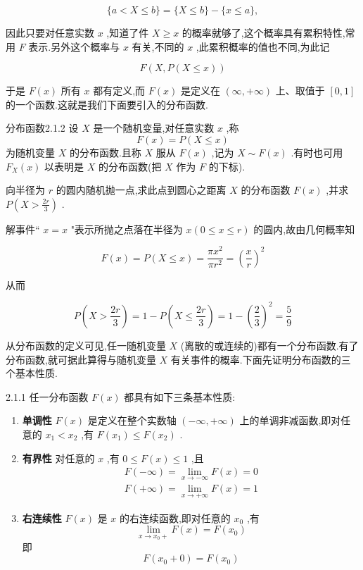 \[
\{a < X \leq b \} = \{ X \leq b\} - \{x\leq a\},
\]

因此只要对任意实数 $ x $ ,知道了件 $ X\geq x $ 的概率就够了,这个概率具有累积特性,常用 $ F $ 表示.另外这个概率与 $ x $ 有关,不同的 $ x $ ,此累积概率的值也不同,为此记

\[
F(X,P(X\leq x))
\]

于是 $ F(x) $ 所有 $ x $ 都有定义,而 $ F(x) $ 是定义在 $ (\infty,+\infty ) $ 上、取值于 $ [0,1] $ 的一个函数.这就是我们下面要引入的分布函数.

\begin{definition}{分布函数}{2.1.2}
	设 $ X $ 是一个随机变量,对任意实数 $ x $ ,称
	\begin{equation} 
	F(x)=P(X \leqslant x) \label{2.1.1}
	\end{equation}
	为随机变量 $ X $ 的分布函数.且称 $ X $ 服从 $ F(x) $ ,记为 $ X\sim F(x) $ .有时也可用 $ F_{X}(x) $ 以表明是 $ X $ 的分布函数(把 $ X $ 作为 $ F $ 的下标).
\end{definition}

\begin{example}\label{exam:2.1.1}
	向半径为 $ r $ 的圆内随机抛一点,求此点到圆心之距离 $ X $ 的分布函数 $ F(x) $ ,并求 $ P\left(X>\frac{2 r}{3}\right) $ .
	
	解事件`` $ x=x $ "表示所抛之点落在半径为 $ x(0 \leqslant x \leqslant r) $ 的圆内,故由几何概率知
	
	\[ 
	F(x)=P(X \leqslant x)=\frac{\pi x^{2}}{\pi r^{2}}=\left(\frac{x}{r}\right)^{2}
	\]
	
	从而
	
	\[ 
	P\left(X>\frac{2 r}{3}\right)=1-P\left(X \leqslant \frac{2 r}{3}\right)=1-\left(\frac{2}{3}\right)^{2}=\frac{5}{9}
	\]
	
	
\end{example}


从分布函数的定义可见,任一随机变量 $ X $ (离散的或连续的)都有一个分布函数.有了分布函数,就可据此算得与随机变量 $ X $ 有关事件的概率.下面先证明分布函数的三个基本性质.

\begin{theorem}{}{2.1.1}
	任一分布函数 $ F(x) $ 都具有如下三条基本性质:
	\begin{enumerate}
		\item \textbf{单调性} $ F(x) $ 是定义在整个实数轴 $ (-\infty,+\infty ) $ 上的单调非减函数,即对任意的 $ x_1<x_2 $ ,有 $ F(x_1)\leq F(x_2) $ .
		\item \textbf{有界性} 对任意的 $ x $ ,有 $ 0\leq F(x)\leq 1 $ ,且
		\[ 
		\begin{array}{l}{F(-\infty)=\lim _{x \rightarrow-\infty} F(x)=0} \\ {F(+\infty)=\lim _{x \rightarrow+\infty} F(x)=1}\end{array}
		\]
		
		\item \textbf{右连续性} $ F(x) $ 是 $ x $ 的右连续函数,即对任意的 $ x_0 $ ,有
		\[ 
		\lim _{x \rightarrow x_{0}+} F(x)=F\left(x_{0}\right)
		\]
		即
		\[ 
		F\left(x_{0}+0\right)=F\left(x_{0}\right)
		\]
	\end{enumerate}
\end{theorem}

